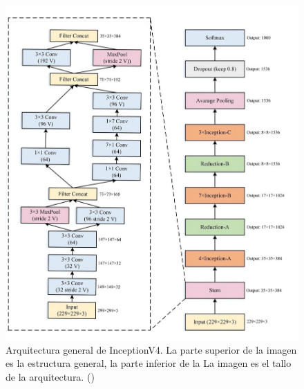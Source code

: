 \begin{itemize}
   \begin{figure}[H]
  	\begin{center}
  		\includegraphics[width=1\textwidth]{2/figures/cnn6.jpeg}
  		\caption{ Arquitectura general de InceptionV4. La parte superior de la imagen es la estructura general, la parte inferior de la
  			La imagen es el tallo de la arquitectura.
  			(\cite{tecnica2})}
  	\end{center}
  \end{figure}
  

\end{itemize}
